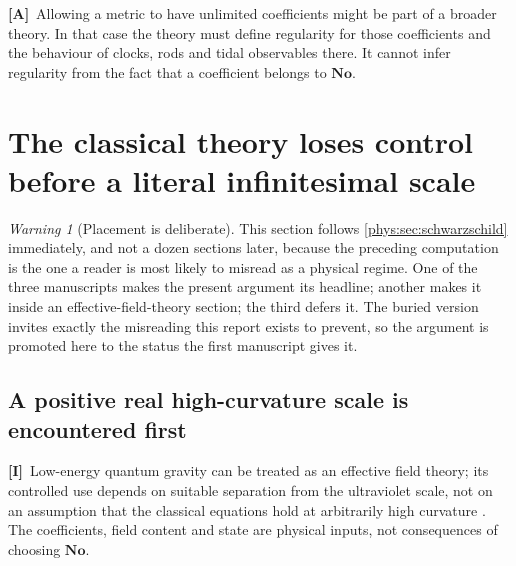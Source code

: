 \documentclass[11pt,letterpaper]{article}
\numberwithin{equation}{section}
\theoremstyle{definition}
\theoremstyle{remark}
\newtheorem{warning}[theorem]{Warning}
\newcommand{\No}{\mathbf{No}}
\newcommand{\TA}{\textcolor{TierA}{\textsf{\bfseries[A]}}}
\newcommand{\TI}{\textcolor{TierI}{\textsf{\bfseries[I]}}}
\begin{document}
\TA\ Allowing a metric to have unlimited coefficients might be part of a
broader theory. In that case the theory must define regularity for those
coefficients and the behaviour of clocks, rods and tidal observables there. It
cannot infer regularity from the fact that a coefficient belongs to $\No$.

\section{The classical theory loses control before a literal infinitesimal scale}
\label{phys:sec:control}

\begin{warning}[Placement is deliberate]
\label{phys:warn:placement}
This section follows \cref{phys:sec:schwarzschild} immediately, and not a
dozen sections later, because the preceding computation is the one a reader is
most likely to misread as a physical regime. One of the three manuscripts makes
the present argument its headline; another makes it inside an
effective-field-theory section; the third defers it. The buried version invites
exactly the misreading this report exists to prevent, so the argument is
promoted here to the status the first manuscript gives it.
\end{warning}

\subsection{A positive real high-curvature scale is encountered first}
\label{phys:sub:rq}

\TI\ Low-energy quantum gravity can be treated as an effective field theory;
its controlled use depends on suitable separation from the ultraviolet scale,
not on an assumption that the classical equations hold at arbitrarily high
curvature \cite{phys:Donoghue,phys:DonoghueReview}. The coefficients, field
content and state are physical inputs, not consequences of choosing $\No$.
\end{document}
